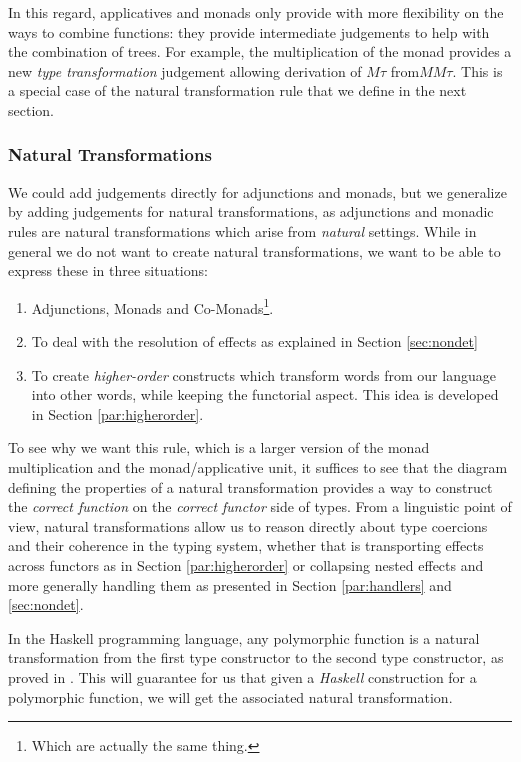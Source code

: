 \smallskip

In this regard, applicatives and monads only provide with more flexibility on
the ways to combine functions:
they provide intermediate judgements to help with the combination of trees.
For example, the multiplication of the monad provides a new \emph{type
	transformation} judgement allowing derivation of $M\tau$ from$MM\tau$.
This is a special case of the natural transformation rule that we
define in the next section.

\subsubsection{Natural Transformations}
We could add judgements directly for adjunctions and monads, but we generalize
by adding judgements for natural transformations, as adjunctions and monadic
rules are natural transformations which arise from \emph{natural} settings.
While in general we do not want to create natural transformations, we want to be
able to express these in three situations:
\begin{enumerate}
	\item Adjunctions, Monads and Co-Monads\footnote{Which are actually the same
		      thing.}.
	\item To deal with the resolution of effects as explained in Section
	      \ref{sec:nondet}
	\item To create \emph{higher-order} constructs which transform words from our
	      language into other words, while keeping the functorial aspect.
	      This idea is developed in Section \ref{par:higherorder}.
\end{enumerate}
To see why we want this rule, which is a larger version of the monad
multiplication and the monad/applicative unit, it suffices to see that the
diagram defining the properties of a natural transformation provides a way
to construct the \emph{correct function} on the \emph{correct functor} side of
types.
From a linguistic point of view, natural transformations allow us to reason
directly about type coercions and their coherence in the typing system,
whether that is transporting effects across functors as in Section
\ref{par:higherorder} or collapsing nested effects and more generally handling
them as presented in Section \ref{par:handlers} and \ref{sec:nondet}.

\smallskip

In the Haskell programming language, any polymorphic function is
a natural transformation from the first type constructor to the second type
constructor, as proved in \cite{wadlerTheoremsFree1989}.
This will guarantee for us that given a \emph{Haskell} construction for a
polymorphic function, we will get the associated natural transformation.

